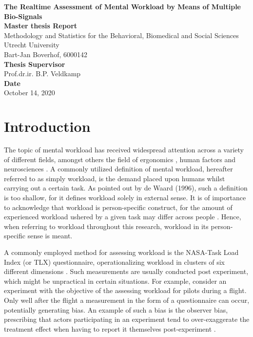 \documentclass[12pt]{article}
\begin{document}
\begin{titlepage}
\begin{center}
\LARGE{\textbf{The Realtime Assessment of Mental Workload by Means of Multiple Bio-Signals}}\\
\vspace*{2\baselineskip}
\Large{\textbf{Master thesis Report}}\\
Methodology and Statistics for the Behavioral, Biomedical and Social Sciences\\
\vspace*{1\baselineskip}
Utrecht University\\
\vspace*{4\baselineskip}
{Bart-Jan Boverhof, 6000142}\\
\vspace*{1\baselineskip}
{\textbf{Thesis Supervisor}}\\
Prof.dr.ir. B.P. Veldkamp\\
\vspace*{1\baselineskip}
{\textbf{Date}}\\
October 14, 2020\\
\vspace*{1\baselineskip}
\end{center}
\end{titlepage}

\section{Introduction} \label{Introduction}
The topic of mental workload has received widespread attention across a variety of different fields, amongst others the field of ergonomics \cite{young2015state}, human factors \cite{pretorius2007development} and neurosciences \cite{shuggi2017mental}.
A commonly utilized definition of mental workload, hereafter referred to as simply workload, is the demand placed upon humans whilst carrying out a certain task. As pointed out by de Waard (1996), such a definition is too shallow, for it defines workload solely in external sense. It is of importance to acknowledge that workload is person-specific construct, for the amount of experienced workload ushered by a given task may differ across people \cite{de1996measurement}. Hence, when referring to workload throughout this research, workload in its person-specific sense is meant.

A commonly employed method for assessing workload is the NASA-Task Load Index (or TLX) questionnaire, operationalizing workload in clusters of six different dimensions \cite{hart2006nasa}. Such measurements are usually conducted post experiment, which might be unpractical in certain situations. For example, consider an experiment with the objective of the assessing workload for pilots during a flight. Only well after the flight a measurement in the form of a questionnaire can occur, potentially generating bias. An example of such a bias is the observer bias, prescribing that actors participating in an experiment tend to over-exaggerate the treatment effect when having to report it themselves post-experiment \cite{mahtani2018catalogue}.
\end{document}
